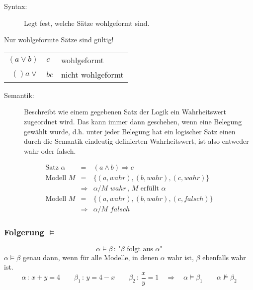\begin{description}
\item[Syntax:] Legt fest, welche Sätze wohlgeformt sind.
\end{description}
Nur wohlgeformte Sätze sind gültig!
\begin{center}
\begin{tabular}{|r @{$\, \Rightarrow \,$}l @{\quad} l|}
\hline
$(a \vee b)$ & $c$ & wohlgeformt \\
$()a \vee$ & $bc$ & nicht wohlgeformt \\ \hline
\end{tabular}
\end{center}


\begin{description}
\item[Semantik:] Beschreibt wie einem gegebenen Satz der Logik ein Wahrheitswert zugeordnet wird. Das kann immer dann geschehen, wenn eine Belegung gewählt wurde, d.h. unter jeder Belegung hat ein logischer Satz einen durch die Semantik eindeutig definierten Wahrheitswert, ist also entweder wahr oder falsch.
\end{description}
\begin{eqnarray*}
\textrm{Satz } \alpha &=& (a \wedge b) \Rightarrow c \\ \textrm{Modell } M &=& \{ (a,wahr) , (b,wahr) , (c,wahr) \} \\ &\Rightarrow& \alpha / M \,\, wahr \, , \, M \textrm{ erfüllt } \alpha \\
\textrm{Modell } M &=& \{ (a,wahr) , (b,wahr) , (c,falsch) \} \\ &\Rightarrow& \alpha / M \,\, falsch
\end{eqnarray*}

\subsubsection*{Folgerung $\models$}

$$\alpha \models \beta \, : \, \textrm{"{}} \beta \textrm{ folgt aus } \alpha \textrm{"{}}$$
$\alpha \models \beta$ genau dann, wenn für alle Modelle, in denen $\alpha$ wahr ist, $\beta$ ebenfalls wahr ist.
$$\alpha \, : \, x+y=4 \qquad \beta_1 \, : \, y = 4-x \qquad \beta_2 \, : \, \frac{x}{y} = 1 \quad \Rightarrow \quad \alpha \models \beta_1 \qquad \alpha \not\models \beta_2$$

